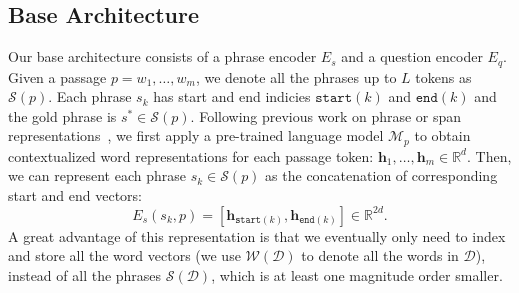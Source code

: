 \documentclass[11pt,a4paper]{article}
\newcommand{\documentset}{\mathcal{D}}
\newcommand{\phraseset}{\mathcal{S}(\mathcal{D})}
\newcommand{\phraseinp}{\mathcal{S}(p)}
\newcommand{\wordset}{\mathcal{W}(\mathcal{D})}
\newcommand{\lm}{\mathcal{M}}
\newcommand\ttt[1]{\texttt{#1}}
\newcommand\mf[1]{\mathbf{#1}}
\begin{document}
\subsection{Base Architecture}
\label{sec:base_model}
Our base architecture consists of a phrase encoder $E_s$ and a question encoder $E_q$. Given a passage $p = w_1, \ldots, w_m$, we denote all the phrases up to $L$ tokens as $\phraseinp$. Each phrase $s_k$ has start and end indicies $\ttt{start}(k)$ and $\ttt{end}(k)$ and the gold phrase is $s^* \in \phraseinp$.
Following previous work on phrase or span representations~\citep{lee2017learning,seo2018phrase}, we first apply a pre-trained language model $\lm_p$ to obtain contextualized word representations for each passage token: $\mf{h}_1, \dots, \mf{h}_m \in \mathbb{R}^d$. Then, we can represent each phrase $s_k \in \phraseinp$ as the concatenation of corresponding start and end vectors:
\vspace{-0.5em}
\begin{equation}
E_s(s_k, p) = [\mf{h}_{\ttt{start}(k)}, \mf{h}_{\ttt{end}(k)}] \in \mathbb{R}^{2d}.
\end{equation}
A great advantage of this representation is that we eventually only need to index and store all the word vectors (we use $\wordset$ to denote all the words in $\documentset$), instead of all the phrases $\phraseset$, which is at least one magnitude order smaller.
\end{document}
